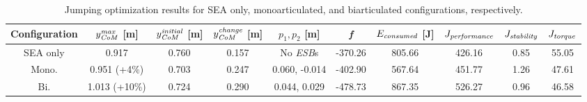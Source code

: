 \documentclass[letterpaper, 10 pt, conference]{ieeeconf}  %
\begin{document}
\begin{table*}[ht]
	\caption{Jumping optimization results for SEA only, monoarticulated, and biarticulated configurations, respectively.}
	\label{table:maxheight}
	\begin{center}
		\begin{tabular}[t]{c|c|c|c|c|c|c|c|c|c}
			Configuration &  $y_{\text{\textit{CoM}}}^{\text{\textit{max}}}$ [m] & $y_{\text{\textit{CoM}}}^{\text{\textit{initial}}}$ [m]& $y_{\text{\textit{CoM}}}^{\text{\textit{change}}}$ [m]& $p_1,p_2$ [m] & \textit{f} & $E_{\text{\textit{consumed}}}$ [J] & $J_{\text{\textit{performance}}}$ & $J_{\text{\textit{stability}}}$ & $J_{\text{\textit{torque}}}$ \\ 
			\hline
			SEA only	& 0.917 & 0.760 & 0.157 & No \textit{ESB}s	& -370.26 & 805.66 & 426.16 & 0.85 & 55.05\\
			\hline
			Mono.		& 0.951 (+4\%) & 0.703 & 0.247 & 0.060, -0.014	& -402.90 & 567.64 & 451.77 & 1.26 & 47.61 \\
			\hline
			Bi.			& 1.013 (+10\%) & 0.724 & 0.290 & 0.044, 0.029		& -478.73 & 867.35 & 526.27 & 0.96 & 46.58
		\end{tabular}
	\end{center}
\end{table*}
\end{document}
